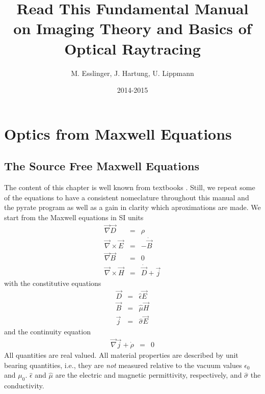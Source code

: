 \documentclass[12pt,a4paper,twoside,openright,BCOR10mm,headsepline,titlepage,abstracton,chapterprefix,final]{scrreprt}
\newcommand\vacuum{0}
\newcommand\Vector[1]{\vec{#1}}
\newcommand\Nabla{\Vector{\nabla}}
\newcommand\timederivative[1]{\dot{{#1}}}
\newcommand\Tensor[1]{\hat{#1}}
\newcommand\scalarEfield{E}
\newcommand\scalarBfield{B}
\newcommand\scalarHfield{H}
\newcommand\scalarDfield{D}
\newcommand\Efield{\Vector{\scalarEfield}}
\newcommand\Bfield{\Vector{\scalarBfield}}
\newcommand\Hfield{\Vector{\scalarHfield}}
\newcommand\Dfield{\Vector{\scalarDfield}}
\newcommand\permeability{\Tensor{\mu}}
\newcommand\vacuumpermeability{\mu_{\vacuum}}
\newcommand\permittivity{\Tensor{\epsilon}}
\newcommand\vacuumpermittivity{\epsilon_{\vacuum}}
\newcommand\conductivity{\Tensor{\sigma}}
\newcommand\currentdensity{\Vector{j}}
\newcommand\chargedensity{\rho}
\begin{document}
\titlehead{ }
\subject{Pyrate -- Optical raytracing based on Python}
\title{Read This Fundamental Manual \\ on Imaging Theory and Basics of Optical Raytracing}
\author{M. Esslinger, J. Hartung, U. Lippmann}
\date{2014-2015}
\publishers{}
\maketitle

\onehalfspacing

\tableofcontents

\chapter{Optics from Maxwell Equations}
\section{The Source Free Maxwell Equations}
The content of this chapter is well known from textbooks \cite{Jackson}. Still, we repeat some of the equations to have a consistent nomeclature throughout this manual and the pyrate program
as well as a gain in clarity which aproximations are made.
We start from the Maxwell equations in SI units
\begin{subequations}\label{eq:Maxwell}
\begin{eqnarray}
  \Nabla \Dfield &=& \chargedensity 							\label{eq:MaxwellNablaD}\\
  \Nabla \times \Efield &=& - \timederivative{\Bfield}  					\label{eq:MaxwellNablaCrossE}\\
  \Nabla \Bfield &=& 0  									\label{eq:MaxwellNablaB}\\
  \Nabla \times \Hfield &=& \timederivative{\Dfield} + \currentdensity  		\label{eq:MaxwellNablaCrossH}
\end{eqnarray}
\end{subequations}
with the constitutive equations
\begin{subequations}\label{eq:Material}
\begin{eqnarray}
  \Dfield &=& \permittivity \Efield 								\label{eq:ConstitutiveEpsilon}\\
  \Bfield &=& \permeability \Hfield 								\label{eq:ConstitutiveMu}\\
  \currentdensity &=& \conductivity \Efield						\label{eq:ConstitutiveSigma}
\end{eqnarray}
\end{subequations}
and the continuity equation
\begin{eqnarray}
  \Nabla \currentdensity + \timederivative{\chargedensity} &=& 0		\label{eq:continuity}
\end{eqnarray}
All quantities are real valued.
All material properties are described by unit bearing quantities, i.e., they are \emph{not} measured relative to the vacuum values $\vacuumpermittivity$ and $\vacuumpermeability$. $\permittivity$ and $\permeability$ are the electric and magnetic permittivity, respectively, and $\conductivity$ the conductivity. 
\end{document}
